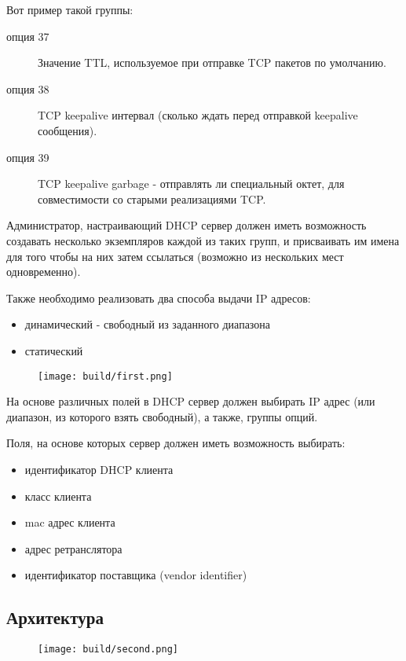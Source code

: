 \documentclass[12pt]{article}
\begin{document}
Вот пример такой группы:
\begin{description}
    \item[опция 37] Значение TTL, используемое при отправке TCP пакетов по умолчанию.
    \item[опция 38] TCP keepalive интервал (сколько ждать перед отправкой keepalive сообщения).
    \item[опция 39] TCP keepalive garbage - отправлять ли специальный октет, для совместимости со старыми реализациями TCP.
\end{description}

Администратор, настраивающий DHCP сервер должен иметь возможность создавать несколько экземпляров каждой из таких групп, и присваивать им имена для того чтобы на них затем ссылаться (возможно из нескольких мест одновременно).

Также необходимо реализовать два способа выдачи IP адресов:
\begin{itemize}
    \item динамический - свободный из заданного диапазона
    \item статический
\end{itemize}

\begin{figure}[H]
    \texttt{[image: build/first.png]}
    \caption{}
\end{figure}

На основе различных полей в DHCP сервер должен выбирать IP адрес (или диапазон, из которого взять свободный), а также, группы опций.

Поля, на основе которых сервер должен иметь возможность выбирать:
\begin{itemize}
    \item идентификатор DHCP клиента
    \item класс клиента
    \item mac адрес клиента
    \item адрес ретранслятора
    \item идентификатор поставщика (vendor identifier)
\end{itemize}

\subsection{Архитектура}

\begin{figure}[H]
    \texttt{[image: build/second.png]}
    \caption{}
    \label{fig:arch}
\end{figure}
\end{document}
